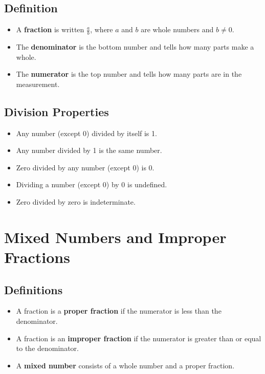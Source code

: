\documentclass[12pt,twoside,twocolumn]{article}
\begin{document}
\subsection*{Definition}
\begin{itemize}\setlength{\itemsep}{-\parsep}
  \item A \textbf{fraction} is written $\frac{a}{b}$, where $a$ and $b$ are whole numbers and $b \neq 0$.
  \item The \textbf{denominator} is the bottom number and tells how many parts make a whole.
  \item The \textbf{numerator} is the top number and tells how many parts are in the measurement.
\end{itemize}

\subsection*{Division Properties}
\begin{itemize}\setlength{\itemsep}{-\parsep}
  \item Any number (except 0) divided by itself is 1.
  \item Any number divided by 1 is the same number.
  \item Zero divided by any number (except 0) is 0.
  \item Dividing a number (except 0) by 0 is undefined.
  \item Zero divided by zero is indeterminate.
\end{itemize}

\section*{Mixed Numbers and Improper Fractions}

\subsection*{Definitions}

\begin{itemize}\setlength{\itemsep}{-\parsep}
  \item A fraction is a \textbf{proper fraction} if the numerator is less than the denominator.
  \item A fraction is an \textbf{improper fraction} if the numerator is greater than or equal to the denominator.
  \item A \textbf{mixed number} consists of a whole number and a proper fraction.
\end{itemize}
\end{document}
